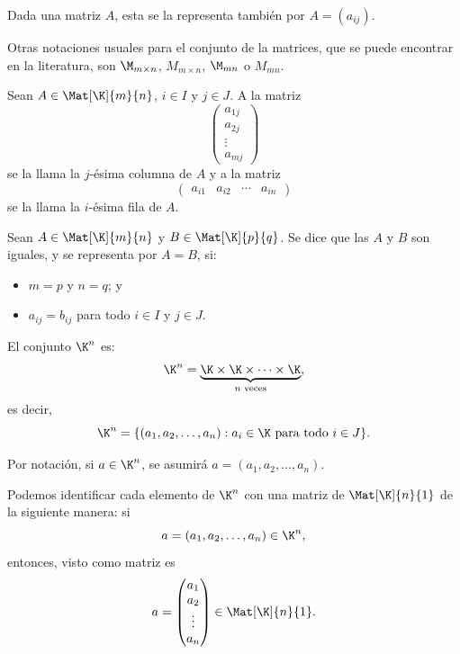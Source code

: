 \documentclass[a4,11pt]{aleph-notas}
\begin{document}
\begin{advertencia}
    Dada una matriz $A$, esta se la representa también por $A=(a_{ij})$.
\end{advertencia}

\begin{advertencia}
    Otras notaciones usuales para el conjunto de la matrices, que se puede encontrar en la literatura, son $\M_{m\times n}$, $M_{m\times n}$, $\M_{mn}$ o $M_{mn}$.
\end{advertencia}

\begin{defi}
    Sean $A\in\Mat[\K]{m}{n}$, $i\in I$ y $j\in J$. A la matriz
    \[
        \begin{pmatrix}
        a_{1j} \\ 
        a_{2j} \\ 
        \vdots \\ 
        a_{mj} 
        \end{pmatrix}
    \]
    se la llama la $j$-ésima columna de $A$ y a la matriz
    \[
        \begin{pmatrix}
        a_{i1}& a_{i2}&\cdots& a_{in}
        \end{pmatrix}
    \]
    se la llama la $i$-ésima fila de $A$.
\end{defi}

\begin{prop}
    Sean $A \in \Mat[\K]{m}{n}$ y $B \in \Mat[\K]{p}{q}$. Se dice que las $A$ y $B$ son iguales, y se representa por $A=B$, si:
    \begin{itemize}
    \item 
        $m=p$ y $n=q$; y
    \item 
        $a_{ij}=b_{ij}$ para todo $i\in I$ y $j \in J$.
    \end{itemize}
\end{prop}

\begin{defi}[Vectores]
    El conjunto $\K^n$ es:
    \[
        \K^n=\underbrace{\K\times\K\times\cdots\times\K}_{n\text{ veces}},
    \]
    es decir,
    \[
        \K^n=\{(a_1,a_2,\ldots,a_n):a_i\in\K\text{ para todo }i \in J\}.
    \]
\end{defi}

\begin{advertencia}
    Por notación, si $a\in\K^n$, se asumirá $a=(a_1,a_2,\ldots,a_n)$.
\end{advertencia}

\begin{advertencia}
    Podemos identificar cada elemento de $\K^n$ con una matriz de $\Mat[\K]{n}{1}$ de la siguiente manera: si
    \[
        a = (a_1,a_2,\ldots,a_n) \in \K^n,
    \]
    entonces, visto como matriz es
    \[
        a = 
        \begin{pmatrix}
            a_1\\a_2\\
            \vdots\\a_n
        \end{pmatrix}
        \in \Mat[\K]{n}{1}.
    \]
\end{advertencia}
\end{document}
